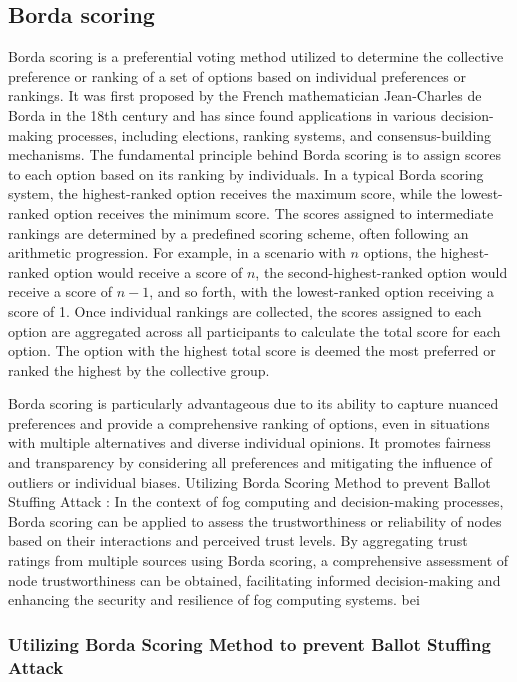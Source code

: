 \documentclass{sn-jnl}%
\begin{document}
\subsection{Borda scoring}
Borda scoring is a preferential voting method utilized to determine the collective preference or ranking of a set of options based on individual preferences or rankings. It was first proposed by the French mathematician Jean-Charles de Borda in the 18th century and has since found applications in various decision-making processes, including elections, ranking systems, and consensus-building mechanisms.
The fundamental principle behind Borda scoring is to assign scores to each option based on its ranking by individuals. In a typical Borda scoring system, the highest-ranked option receives the maximum score, while the lowest-ranked option receives the minimum score. The scores assigned to intermediate rankings are determined by a predefined scoring scheme, often following an arithmetic progression.
For example, in a scenario with \( n \) options, the highest-ranked option would receive a score of \( n \), the second-highest-ranked option would receive a score of \( n-1 \), and so forth, with the lowest-ranked option receiving a score of 1. Once individual rankings are collected, the scores assigned to each option are aggregated across all participants to calculate the total score for each option. The option with the highest total score is deemed the most preferred or ranked the highest by the collective group.


Borda scoring is particularly advantageous due to its ability to capture nuanced preferences and provide a comprehensive ranking of options, even in situations with multiple alternatives and diverse individual opinions. It promotes fairness and transparency by considering all preferences and mitigating the influence of outliers or individual biases.
Utilizing Borda Scoring Method to prevent Ballot Stuffing Attack :
In the context of fog computing and decision-making processes, Borda scoring can be applied to assess the trustworthiness or reliability of nodes based on their interactions and perceived trust levels. By aggregating trust ratings from multiple sources using Borda scoring, a comprehensive assessment of node trustworthiness can be obtained, facilitating informed decision-making and enhancing the security and resilience of fog computing systems.
bei
\subsubsection*{Utilizing Borda Scoring Method to prevent Ballot Stuffing Attack}
\end{document}
